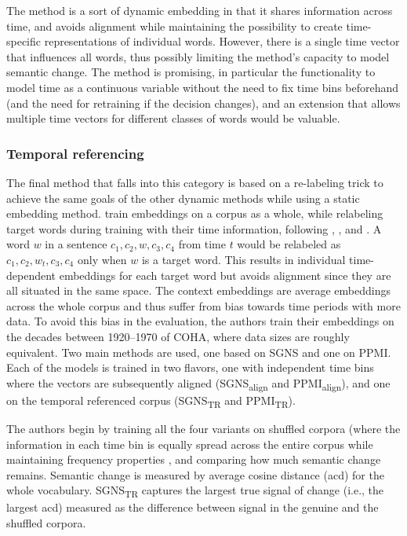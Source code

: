 \documentclass[output=paper]{langsci/langscibook}
\begin{document}
The method is a sort of dynamic embedding in that it shares information across time, and avoids alignment while maintaining the possibility to create time-specific representations of individual words.  However, there is a single time vector that influences all words, thus possibly limiting the method's capacity to model semantic change. 
The method is promising, in particular the functionality to model time as a continuous variable without the need to fix time bins beforehand (and the need for retraining if the decision changes), and an extension that allows multiple time vectors for different classes of words would be valuable. 


\subsubsection{Temporal referencing}
The final method that falls into this category is based on a re-labeling trick to achieve the same goals of the other dynamic methods while using a static embedding method. \citet{dubossarsky-etal-2019-time} train embeddings on a corpus as a whole, while relabeling target words during training with their time information, following \citet{ferrari2017detecting}, \citet{fiser-ljubesic-2018}, and \citet{schlechtweg-etal-2019-wind}. A word $w$ in a sentence $c_1, c_2, w, c_3, c_4$ from time $t$ would be relabeled as $c_1, c_2, w_t, c_3, c_4$ only when $w$ is a target word. This results in individual time-dependent embeddings for each target word but avoids alignment since they are all situated in the same space. The context embeddings are average embeddings across the whole corpus and thus suffer from bias towards time periods with more data. To avoid this bias in the evaluation, the authors train their embeddings on the decades between 1920--1970 of COHA, where data sizes are roughly equivalent. Two main methods are used, one based on SGNS and one on PPMI. Each of the models is trained in two flavors, one with independent time bins where the vectors are subsequently aligned (SGNS\textsubscript{align} and PPMI\textsubscript{align}), and one on the temporal referenced corpus (SGNS\textsubscript{TR} and PPMI\textsubscript{TR}). 

The authors begin by training all the four variants on shuffled corpora (where the information in each time bin is equally spread across the entire corpus while maintaining frequency properties \citep[see][]{dubossarsky-etal-2017-outta}, and comparing how much semantic change remains. Semantic change is measured by average cosine distance (acd) for the whole vocabulary. SGNS\textsubscript{TR} captures the largest true signal of change (i.e., the largest acd) measured as the difference between signal in the genuine and the shuffled corpora. 
\end{document}
